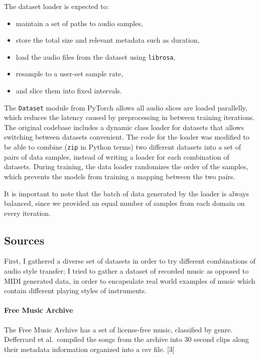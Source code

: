 \documentclass[12pt,a4paper,]{report}
\providecommand{\tightlist}{%
  \setlength{\itemsep}{0pt}\setlength{\parskip}{0pt}}
\begin{document}
The dataset loader is expected to:

\begin{itemize}
\tightlist
\item
  maintain a set of paths to audio samples,
\item
  store the total size and relevant metadata such as duration,
\item
  load the audio files from the dataset using \texttt{librosa},
\item
  resample to a user-set sample rate,
\item
  and slice them into fixed intervals.
\end{itemize}

The \texttt{Dataset} module from PyTorch allows all audio slices are
loaded parallelly, which reduces the latency caused by preprocessing in
between training iterations. The original codebase includes a dynamic
class loader for datasets that allows switching between datasets
convenient. The code for the loader was modified to be able to combine
(\texttt{zip} in Python terms) two different datasets into a set of
pairs of data samples, instead of writing a loader for each combination
of datasets. During training, the data loader randomizes the order of
the samples, which prevents the models from training a mapping between
the two pairs.

It is important to note that the batch of data generated by the loader
is always balanced, since we provided an equal number of samples from
each domain on every iteration.

\hypertarget{sources}{%
\subsection{Sources}\label{sources}}

First, I gathered a diverse set of datasets in order to try different
combinations of audio style transfer; I tried to gather a dataset of
recorded music as opposed to MIDI generated data, in order to
encapsulate real world examples of music which contain different playing
styles of instruments.

\paragraph{Free Music Archive}

The Free Music Archive has a set of license-free music, classified by
genre. Defferrard et al.~compiled the songs from the archive into 30
second clips along their metadata information organized into a csv file.
{[}3{]}
\end{document}
